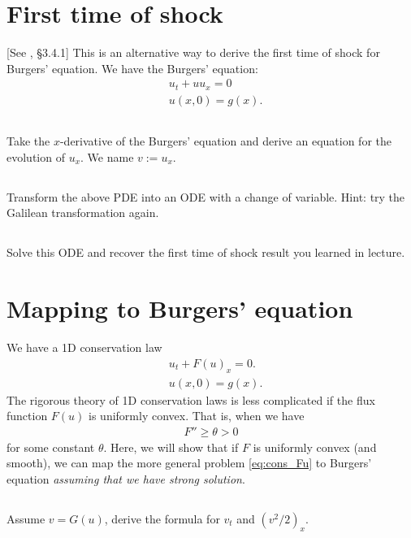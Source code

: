 \documentclass[11pt,letterpaper]{article}
\begin{document}
\section{First time of shock}
[See \cite{ShearerLevy_15}, \S 3.4.1] This is an alternative way to derive the first time of shock for Burgers' equation. We have the Burgers' equation:
\begin{align}
    & u_t + uu_x = 0\label{eq:burgers}\\
    & u(x,0) = g(x).\nonumber
\end{align}

\subsection{}
Take the $x$-derivative of the Burgers' equation and derive an equation for the evolution of $u_x$. We name $v:= u_x$.

\subsection{}
Transform the above PDE into an ODE with a change of variable. Hint: try the Galilean transformation again.

\subsection{}
Solve this ODE and recover the first time of shock result you learned in lecture.

\section{Mapping to Burgers' equation}
We have a 1D conservation law
\begin{align}
    & u_t + F(u)_x = 0.\label{eq:cons_Fu}\\
    & u(x,0) = g(x).\nonumber
\end{align}
The rigorous theory of 1D conservation laws is less complicated if the flux function $F(u)$ is uniformly convex. That is, when we have
\begin{align}
    F''\geq\theta>0
\end{align}
for some constant $\theta$. Here, we will show that if $F$ is uniformly convex (and smooth), we can map the more general problem \eqref{eq:cons_Fu} to Burgers' equation \textit{assuming that we have strong solution}.

\subsection{}
Assume $v=G(u)$, derive the formula for $v_t$ and $(v^2/2)_x$.
\end{document}
